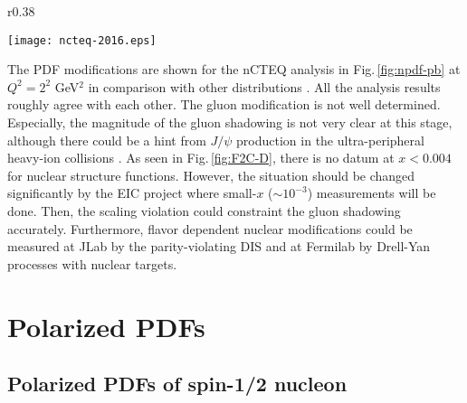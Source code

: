 \documentclass{PoS}
\begin{document}
\vfill\eject 

\begin{wrapfigure}[16]{r}{0.38\textwidth}
    \hspace{-0.40cm}
\begin{minipage}[c]{0.38\textwidth}
    \vspace{0.20cm}
   \begin{center}
     \texttt{[image: ncteq-2016.eps]}
   \end{center}
\vspace{-0.60cm}
\caption{PDF modifications in iron \cite{ncteq-2016}.}
\label{fig:npdf-pb}
\vspace{-0.60cm}
\end{minipage}
\end{wrapfigure}

The PDF modifications are shown for the nCTEQ analysis 
in Fig.\,\ref{fig:npdf-pb} at $Q^2 = 2^2$ GeV$^2$ 
in comparison with other distributions \cite{ncteq-2016}.
All the analysis results roughly agree with each other. 
The gluon modification is not well determined. Especially, the magnitude
of the gluon shadowing is not very clear at this stage, although
there could be a hint from $J/\psi$ production in the ultra-peripheral
heavy-ion collisions \cite{j/psi-upc}. As seen in Fig.\,\ref{fig:F2C-D},
there is no datum at $x<0.004$ for nuclear structure functions. However,
the situation should be changed significantly by the EIC project where
small-$x$ ($\sim 10^{-3}$) measurements will be done. Then, the scaling
violation could constraint the gluon shadowing accurately.
Furthermore, flavor dependent nuclear modifications could be measured
at JLab by the parity-violating DIS and 
at Fermilab by Drell-Yan processes with nuclear targets.

\section{Polarized PDFs}
\label{polarized-pdfs}

\subsection{Polarized PDFs of spin-1/2 nucleon}
\label{spin-1/2-nucleon}
\end{document}
